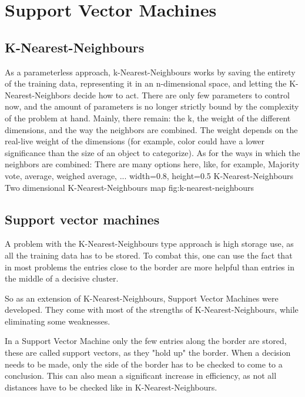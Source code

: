 \section{Support Vector Machines}
\label{sec:SVM}
\subsection{K-Nearest-Neighbours}
\cite[p. 783]{MA}
As a parameterless approach, k-Nearest-Neighbours works by saving the entirety of the training data, representing it in an n-dimensional space, and letting the K-Nearest-Neighbors decide how to act. There are only few parameters to control now, and the amount of parameters is no longer strictly bound by the complexity of the problem at hand. Mainly, there remain: the k, the weight of the different dimensions, and the way the neighbors are combined. 
The weight depends on the real-live weight of the dimensions (for example, color could have a lower significance than the size of an object to categorize).
As for the ways in which the neighbors are combined: There are many options here, like, for example, Majority vote, average, weighed average, ...
    {width=0.8\textwidth, height=0.5\textheight} %
    {K-Nearest-Neighbours}   %
    {Two dimensional K-Nearest-Neighbours map}   %
    {fig:k-nearest-neighbours}    %

\subsection{Support vector machines}
\cite[p. 744]{MA}
A problem with the K-Nearest-Neighbours type approach is high storage use, as all the training data has to be stored. To combat this, one can use the fact that in most problems the entries close to the border are more helpful than entries in the middle of a decisive cluster.

So as an extension of K-Nearest-Neighbours, Support Vector Machines were developed. They come with most of the strengths of K-Nearest-Neighbours, while eliminating some weaknesses.

In a Support Vector Machine only the few entries along the border are stored, these are called support vectors, as they "hold up" the border. When a decision needs to be made, only the side of the border has to be checked to come to a conclusion. This can also mean a significant increase in efficiency, as not all distances have to be checked like in K-Nearest-Neighbours.

